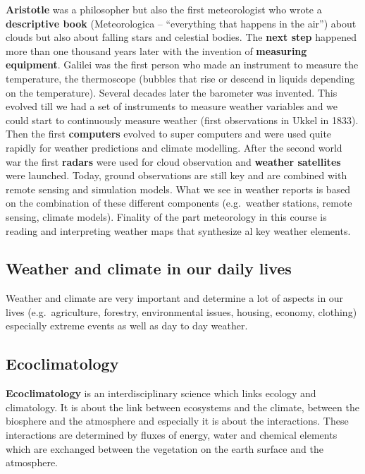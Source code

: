 \documentclass[oneside]{book}
\begin{document}
\textbf{Aristotle} was a philosopher but also the first meteorologist
who wrote a \textbf{descriptive book} (Meteorologica -- ``everything
that happens in the air'') about clouds but also about falling stars and
celestial bodies. The \textbf{next step} happened more than one thousand
years later with the invention of \textbf{measuring equipment}. Galilei
was the first person who made an instrument to measure the temperature,
the thermoscope (bubbles that rise or descend in liquids depending on
the temperature). Several decades later the barometer was invented. This
evolved till we had a set of instruments to measure weather variables
and we could start to continuously measure weather (first observations
in Ukkel in 1833). Then the first \textbf{computers} evolved to super
computers and were used quite rapidly for weather predictions and
climate modelling. After the second world war the first \textbf{radars}
were used for cloud observation and \textbf{weather satellites} were
launched. Today, ground observations are still key and are combined with
remote sensing and simulation models. What we see in weather reports is
based on the combination of these different components (e.g.~weather
stations, remote sensing, climate models). Finality of the part
meteorology in this course is reading and interpreting weather maps that
synthesize al key weather elements.

\subsection{Weather and climate in our daily
lives}\label{weather-and-climate-in-our-daily-lives}

Weather and climate are very important and determine a lot of aspects in
our lives (e.g.~agriculture, forestry, environmental issues, housing,
economy, clothing) especially extreme events as well as day to day
weather.

\subsection{Ecoclimatology}\label{ecoclimatology}

\textbf{Ecoclimatology} is an interdisciplinary science which links
ecology and climatology. It is about the link between ecosystems and the
climate, between the biosphere and the atmosphere and especially it is
about the interactions. These interactions are determined by fluxes of
energy, water and chemical elements which are exchanged between the
vegetation on the earth surface and the atmosphere.
\end{document}
